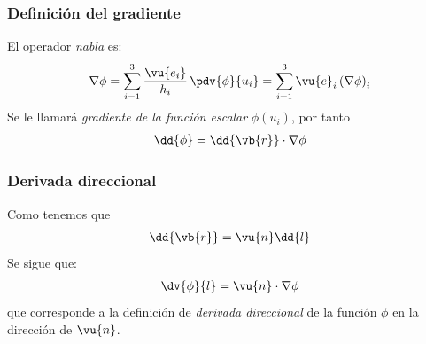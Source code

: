\begin{frame}
\frametitle{Definición del gradiente}
El operador \emph{nabla} es:
\begin{align}
\nabla{\phi} = \sum_{i=1}^{3} \dfrac{\vu{e_{i}}}{h_{i}} \, \pdv{\phi}{u_{i}} = \sum_{i=1}^{3} \vu{e}_{i} \left( \nabla{\phi} \right)_{i}
\label{eq:ecuacion_01_28}
\end{align}
\pause
Se le llamará \emph{gradiente de la función escalar} $\phi(u_{i})$, por tanto
\begin{align}
\dd{\phi} = \dd{\vb{r}} \cdot \nabla{\phi}
\label{eq:ecuacion_01_29}
\end{align}
\end{frame}
\begin{frame}
\frametitle{Derivada direccional}
Como tenemos que
\begin{align*}
\dd{\vb{r}} = \vu{n} \dd{l}
\end{align*}
\pause
Se sigue que:
\begin{align*}
\dv{\phi}{l} = \vu{n} \cdot \nabla{\phi}
\end{align*}
que corresponde a la definición de \emph{derivada direccional} de la función $\phi$ en la dirección de $\vu{n}$.
\end{frame}
